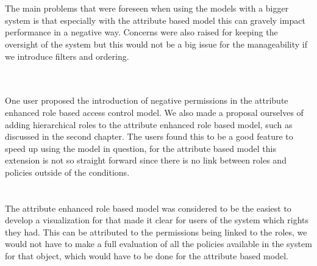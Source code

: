 \textbf{ }
\\
\\
The main problems that were foreseen when using the models with a bigger system is that especially with the attribute based model this can gravely impact performance in a negative way.
Concerns were also raised for keeping the oversight of the system but this would not be a big issue for the manageability if we introduce filters and ordering.

\textbf{ }
\\
\\
One user proposed the introduction of negative permissions in the attribute enhanced role based access control model.
We also made a proposal ourselves of adding hierarchical roles to the attribute enhanced role based model, such as discussed in the second chapter.
The users found this to be a good feature to speed up using the model in question, for the attribute based model this extension is not so straight forward since there is no link between roles and policies outside of the conditions.
\\

\textbf{ }
\\
\\
The attribute enhanced role based model was considered to be the easiest to develop a visualization for that made it clear for users of the system which rights they had.
This can be attributed to the permissions being linked to the roles, we would not have to make a full evaluation of all the policies available in the system for that object, which would have to be done for the attribute based model.

